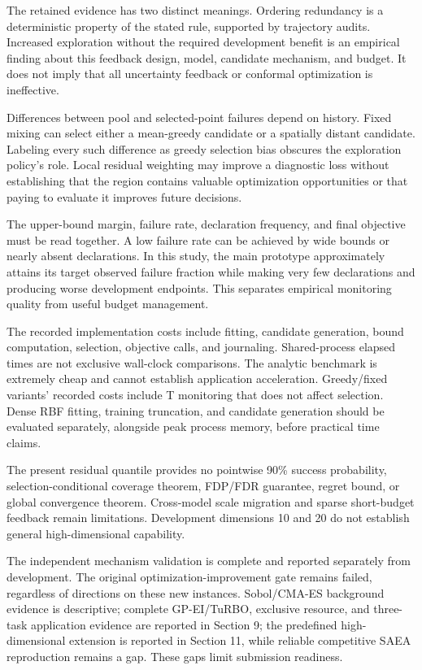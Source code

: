 \documentclass[11pt,a4paper]{article}
\begin{document}
The retained evidence has two distinct meanings. Ordering redundancy is
a deterministic property of the stated rule, supported by trajectory
audits. Increased exploration without the required development benefit
is an empirical finding about this feedback design, model, candidate
mechanism, and budget. It does not imply that all uncertainty feedback
or conformal optimization is ineffective.

Differences between pool and selected-point failures depend on history.
Fixed mixing can select either a mean-greedy candidate or a spatially
distant candidate. Labeling every such difference as greedy selection
bias obscures the exploration policy's role. Local residual weighting
may improve a diagnostic loss without establishing that the region
contains valuable optimization opportunities or that paying to evaluate
it improves future decisions.

The upper-bound margin, failure rate, declaration frequency, and final
objective must be read together. A low failure rate can be achieved by
wide bounds or nearly absent declarations. In this study, the main
prototype approximately attains its target observed failure fraction
while making very few declarations and producing worse development
endpoints. This separates empirical monitoring quality from useful
budget management.

The recorded implementation costs include fitting, candidate generation,
bound computation, selection, objective calls, and journaling.
Shared-process elapsed times are not exclusive wall-clock comparisons.
The analytic benchmark is extremely cheap and cannot establish
application acceleration. Greedy/fixed variants' recorded costs include
T monitoring that does not affect selection. Dense RBF fitting, training
truncation, and candidate generation should be evaluated separately,
alongside peak process memory, before practical time claims.

The present residual quantile provides no pointwise 90\% success
probability, selection-conditional coverage theorem, FDP/FDR guarantee,
regret bound, or global convergence theorem. Cross-model scale migration
and sparse short-budget feedback remain limitations. Development
dimensions 10 and 20 do not establish general high-dimensional
capability.

The independent mechanism validation is complete and reported separately
from development. The original optimization-improvement gate remains
failed, regardless of directions on these new instances. Sobol/CMA-ES
background evidence is descriptive; complete GP-EI/TuRBO, exclusive
resource, and three-task application evidence are reported in Section 9;
the predefined high-dimensional extension is reported in Section 11,
while reliable competitive SAEA reproduction remains a gap. These gaps
limit submission readiness.
\end{document}
